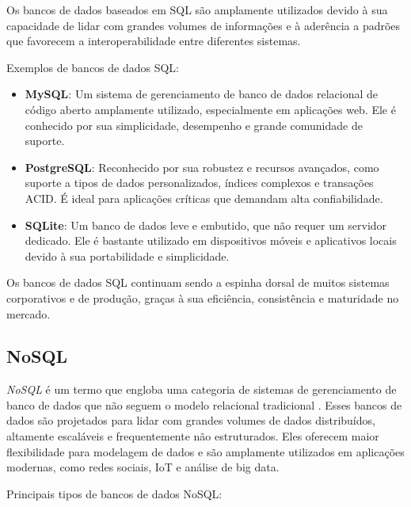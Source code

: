 Os bancos de dados baseados em SQL são amplamente utilizados devido à sua capacidade de lidar com grandes volumes de informações e à aderência a padrões que favorecem a interoperabilidade entre diferentes sistemas.

Exemplos de bancos de dados SQL:

\begin{itemize}
    \item \textbf{MySQL}: Um sistema de gerenciamento de banco de dados relacional de código aberto amplamente utilizado, especialmente em aplicações web. Ele é conhecido por sua simplicidade, desempenho e grande comunidade de suporte.
    \item \textbf{PostgreSQL}: Reconhecido por sua robustez e recursos avançados, como suporte a tipos de dados personalizados, índices complexos e transações ACID. É ideal para aplicações críticas que demandam alta confiabilidade.
    \item \textbf{SQLite}: Um banco de dados leve e embutido, que não requer um servidor dedicado. Ele é bastante utilizado em dispositivos móveis e aplicativos locais devido à sua portabilidade e simplicidade.
\end{itemize}

Os bancos de dados SQL continuam sendo a espinha dorsal de muitos sistemas corporativos e de produção, graças à sua eficiência, consistência e maturidade no mercado.

\subsection{NoSQL}


\emph{NoSQL} é um termo que engloba uma categoria de sistemas de gerenciamento de banco de dados que não seguem o modelo relacional tradicional \cite{nosql-vs-sql}. Esses bancos de dados são projetados para lidar com grandes volumes de dados distribuídos, altamente escaláveis e frequentemente não estruturados. Eles oferecem maior flexibilidade para modelagem de dados e são amplamente utilizados em aplicações modernas, como redes sociais, IoT e análise de big data.

Principais tipos de bancos de dados NoSQL:

